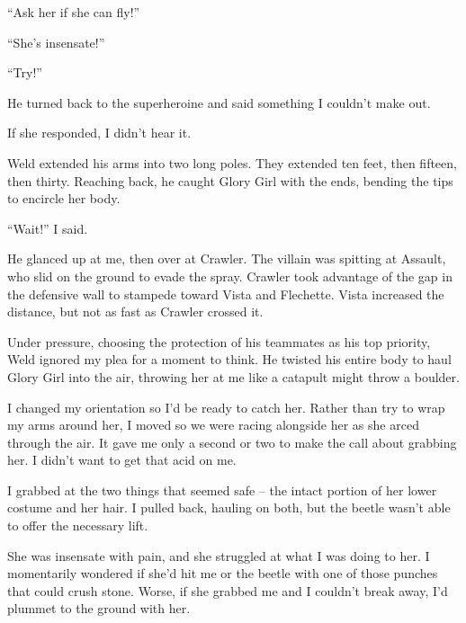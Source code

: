 ``Ask her if she can fly!''



``She's insensate!''



``Try!''



He turned back to the superheroine and said something I couldn't make out.



If she responded, I didn't hear it.



Weld extended his arms into two long poles.  They extended ten feet, then fifteen, then thirty.  Reaching back, he caught Glory Girl with the ends, bending the tips to encircle her body.



``Wait!'' I said.



He glanced up at me, then over at Crawler.  The villain was spitting at Assault, who slid on the ground to evade the spray.  Crawler took advantage of the gap in the defensive wall to stampede toward Vista and Flechette.  Vista increased the distance, but not as fast as Crawler crossed it.



Under pressure, choosing the protection of his teammates as his top priority, Weld ignored my plea for a moment to think.  He twisted his entire body to haul Glory Girl into the air, throwing her at me like a catapult might throw a boulder.



I changed my orientation so I'd be ready to catch her.  Rather than try to wrap my arms around her, I moved so we were racing alongside her as she arced through the air.  It gave me only a second or two to make the call about grabbing her.  I didn't want to get that acid on me.



I grabbed at the two things that seemed safe – the intact portion of her lower costume and her hair.  I pulled back, hauling on both, but the beetle wasn't able to offer the necessary lift.



She was insensate with pain, and she struggled at what I was doing to her.  I momentarily wondered if she'd hit me or the beetle with one of those punches that could crush stone. Worse, if she grabbed me and I couldn't break away, I'd plummet to the ground with her.



